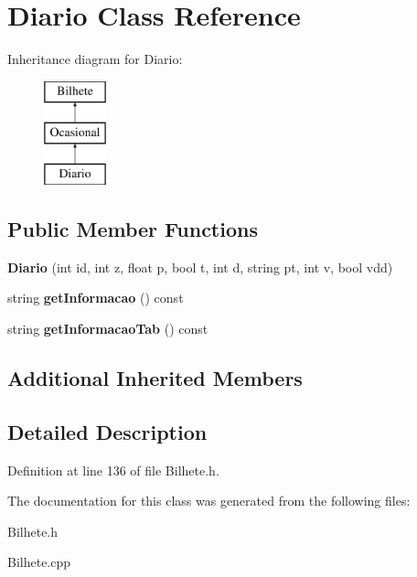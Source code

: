 \hypertarget{classDiario}{}\section{Diario Class Reference}
\label{classDiario}
Inheritance diagram for Diario\+:\begin{figure}[H]
\begin{center}
\leavevmode
\includegraphics[height=3.000000cm]{classDiario}
\end{center}
\end{figure}
\subsection*{Public Member Functions}
\begin{DoxyCompactItemize}
\item 
\mbox{\label{classDiario_a38ee8a53dc3e2dc1af53342130e3d506}} 
{\bfseries Diario} (int id, int z, float p, bool t, int d, string pt, int v, bool vdd)
\item 
\mbox{\label{classDiario_a891900397f682f3ea0115c4e3e7a9355}} 
string {\bfseries get\+Informacao} () const
\item 
\mbox{\label{classDiario_abce758e396a86aa033ad5d9718e36273}} 
string {\bfseries get\+Informacao\+Tab} () const
\end{DoxyCompactItemize}
\subsection*{Additional Inherited Members}


\subsection{Detailed Description}


Definition at line 136 of file Bilhete.\+h.



The documentation for this class was generated from the following files\+:\begin{DoxyCompactItemize}
\item 
Bilhete.\+h\item 
Bilhete.\+cpp\end{DoxyCompactItemize}
